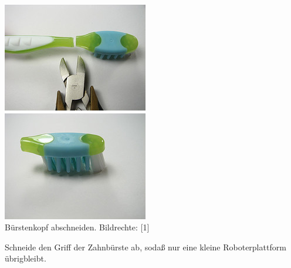 \documentclass[10pt,a4paper,ngerman,twoside]{article} %
\begin{document}
\begin{multicols}{3}
\begin{center}
\includegraphics[width=\linewidth]{bristlebot/bristlebot4.jpg}\\
\includegraphics[width=\linewidth]{bristlebot/bristlebot5.jpg}\\
\footnotesize{Bürstenkopf abschneiden. Bildrechte: [1]}
\end{center}

Schneide den Griff der Zahnbürste ab, sodaß nur eine kleine Roboterplattform übrigbleibt. \\ 


\end{multicols}
\end{document}
